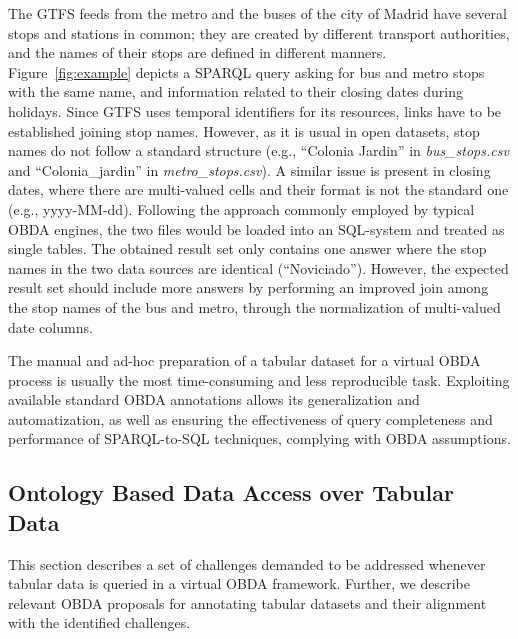 The GTFS feeds from the metro and the buses of the city of Madrid have several stops and stations in common; they are created by different transport authorities, and the names of their stops are defined in different manners. Figure~\ref{fig:example} depicts a SPARQL query asking for bus and metro stops with the same name, and information related to their closing dates during holidays. Since GTFS uses temporal identifiers for its resources, links have to be established joining stop names. However, as it is usual in open datasets, stop names do not follow a standard structure (e.g., ``Colonia Jardin'' in \textit{bus\_stops.csv} and ``Colonia\_jardin'' in \textit{metro\_stops.csv}). A similar issue is present in closing dates, where there are multi-valued cells and their format is not the standard one (e.g., yyyy-MM-dd). Following the approach commonly employed by typical OBDA engines, the two files would be loaded into an SQL-system and treated as single tables. The obtained result set only contains one answer where the stop names in the two data sources are identical (``Noviciado''). However, the expected result set should include more answers by performing an improved join among the stop names of the bus and metro, through the normalization of multi-valued date columns.

The manual and ad-hoc preparation of a tabular dataset for a virtual OBDA process is usually the most time-consuming and less reproducible task. Exploiting available standard OBDA annotations allows its generalization and automatization, as well as ensuring the effectiveness of query completeness and performance of SPARQL-to-SQL techniques, complying with OBDA assumptions.


\subsection{Ontology Based Data Access over Tabular Data}
This section describes a set of challenges demanded to be addressed whenever tabular data is queried in a virtual OBDA framework. Further, we describe relevant OBDA proposals for annotating tabular datasets and their alignment with the identified challenges.

